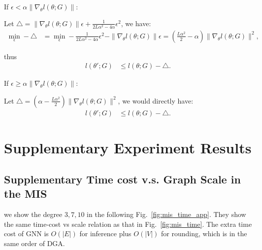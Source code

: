 If $\epsilon < \alpha \|\nabla_{\theta}l(\theta;G)\|$:

\qquad Let $\triangle = \|\nabla_{\theta} l(\theta;G)\| \epsilon + \frac{1}{2L\alpha^2 - 4\alpha}\epsilon^2$, we have:
\begin{equation}
\begin{aligned}
\min_{\epsilon} - \triangle & = \min_{\epsilon} -\frac{1}{2L\alpha^2 - 4\alpha} \epsilon^2 - \|\nabla_{\theta}l(\theta;G)\|\epsilon  = (\frac{L\alpha^2}{2}-\alpha)\|\nabla_{\theta}l(\theta;G)\|^2,
\end{aligned}
\end{equation}

\qquad thus
\begin{equation}
\begin{aligned}
    l(\theta';G) &\leq l(\theta;G) - \triangle.
\end{aligned}
\end{equation}

If $\epsilon \geq \alpha \|\nabla_{\theta}l(\theta;G)\|$:

\qquad Let $\triangle = (\alpha - \frac{L\alpha^2}{2})\|\nabla_{\theta}l(\theta;G)\|^2$, we would directly have:
\begin{equation}
\begin{aligned}
    l(\theta';G) &\leq l(\theta;G) - \triangle.
\end{aligned}
\end{equation}
\fi

\section{Supplementary Experiment Results}
\subsection{Supplementary Time cost v.s. Graph Scale in the MIS}
we show the degree $3,7,10$ in the following Fig.~\ref{fig:mis_time_app}. They show the same time-cost vs scale relation as that in Fig.~\ref{fig:mis_time}. The extra time cost of GNN is $O(|E|)$ for inference plus $O(|V|)$ for rounding, which is in the same order of DGA.

